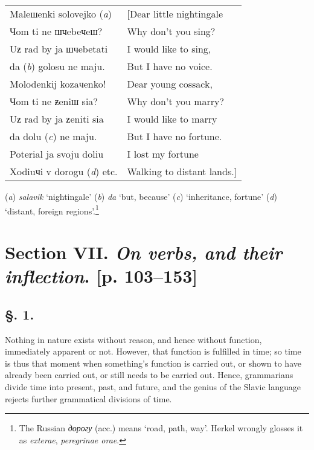 \begin{longtable}{ l l }
    Maleшenki solovejko (\textit{a}) & [Dear little nightingale \\
    Чom ti ne шчebeчeш?	& Why don’t you sing? \\
    Uƶ rad by ja шчebetati & I would like to sing, \\
    da (\textit{b}) golosu ne maju. & But I have no voice. \\
    Molodenkij kozaчenko! & Dear young cossack, \\
    Чom ti ne ƶeniш sia? & Why don’t you marry? \\
    Uƶ rad by ja ƶeniti sia & I would like to marry \\
    da dolu (\textit{c}) ne maju. & But I have no fortune. \\
    Poterial ja svoju doliu & I lost my fortune \\
    Xodiuчi v dorogu (\textit{d}) etc. & Walking to distant lands.] \\
\end{longtable}

(\textit{a}) \textit{salavik} ‘nightingale’ (\textit{b}) \textit{da} ‘but, because’ (\textit{c}) ‘inheritance, fortune’ (\textit{d}) ‘distant, foreign regions’.\footnote{The Russian \textit{дорогу} (acc.) means ‘road, path, way’. Herkel wrongly glosses it as \textit{exterae}, \textit{peregrinae orae}.}

\section*{Section VII. \textit{On verbs, and their inflection}. [p. 103--153]}

\subsection*{\hspace*{\fill}§. 1.\hspace*{\fill}}

Nothing in nature exists without reason, and hence without function, immediately apparent or not. However, that function is fulfilled in time; so time is thus that moment when something’s function is carried out, or shown to have already been carried out, or still needs to be carried out. Hence, grammarians divide time into present, past, and future, and the genius of the Slavic language rejects further grammatical divisions of time.

